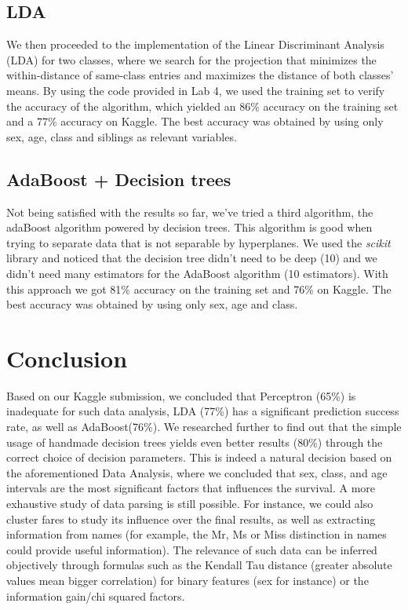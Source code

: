 \documentclass[12pt,a4paper]{article}
\begin{document}
\subsection{LDA} 
We then proceeded to the implementation of the Linear Discriminant Analysis (LDA) for two classes, where we search for the projection that minimizes the within-distance of same-class entries and maximizes the distance of both classes' means. By using the code provided in Lab 4, we used the training set to verify the accuracy of the algorithm, which yielded an 86\% accuracy on the training set and a 77\% accuracy on Kaggle. The best accuracy was obtained by using only sex, age, class and siblings as relevant variables. 

\subsection{AdaBoost + Decision trees}
Not being satisfied with the results so far, we've tried a third algorithm, the adaBoost algorithm powered by decision trees. This algorithm is good when trying to separate data that is not separable by hyperplanes. We used the \textit{scikit} library and noticed that the decision tree didn't need to be deep (10) and we didn't need many estimators for the AdaBoost algorithm (10 estimators). With this approach we got 81\% accuracy on the training set and 76\% on Kaggle. The best accuracy was obtained by using only sex, age and class.

\section*{Conclusion} 
Based on our Kaggle submission, we concluded that Perceptron (65\%) is inadequate for such data analysis, LDA (77\%) has a significant prediction success rate, as well as AdaBoost(76\%). We researched further to find out that the simple usage of handmade decision trees yields even better results (80\%)  through the correct choice of decision parameters. This is indeed a natural decision based on the aforementioned Data Analysis, where we concluded that sex, class, and age intervals are the most significant factors that influences the survival. A more exhaustive study of data parsing is still possible. For instance, we could also cluster fares to study its influence over the final results, as well as extracting information from names (for example, the Mr, Ms or Miss distinction in names could provide useful information). The relevance of such data can be inferred objectively through formulas such as the Kendall Tau distance (greater absolute values mean bigger correlation) for binary features (sex for instance) or the information gain/chi squared factors.
\end{document}
